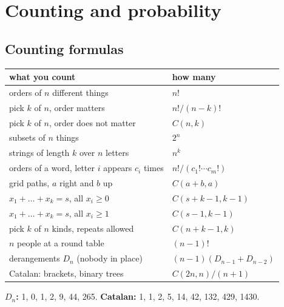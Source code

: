 \section{Counting and probability}

\subsection{Counting formulas}\label{t:counting}
\begin{tabularx}{\linewidth}{@{}Xl@{}}
\toprule
what you count & how many\\
\midrule
orders of $n$ different things & $n!$\\
pick $k$ of $n$, order matters & $n! / (n-k)!$\\
pick $k$ of $n$, order does not matter & $C(n, k)$\\
subsets of $n$ things & $2^n$\\
strings of length $k$ over $n$ letters & $n^k$\\
orders of a word, letter $i$ appears $c_i$ times & $n! / (c_1! \cdots c_m!)$\\
grid paths, $a$ right and $b$ up & $C(a+b, a)$\\
$x_1 + \dots + x_k = s$, all $x_i \ge 0$ & $C(s+k-1, k-1)$\\
$x_1 + \dots + x_k = s$, all $x_i \ge 1$ & $C(s-1, k-1)$\\
pick $k$ of $n$ kinds, repeats allowed & $C(n+k-1, k)$\\
$n$ people at a round table & $(n-1)!$\\
derangements $D_n$ (nobody in place) & $(n-1)(D_{n-1} + D_{n-2})$\\
Catalan: brackets, binary trees & $C(2n, n) / (n+1)$\\
\bottomrule
\end{tabularx}
\textbf{$D_n$:} 1, 0, 1, 2, 9, 44, 265. \textbf{Catalan:} 1, 1, 2, 5, 14, 42, 132, 429, 1430.




